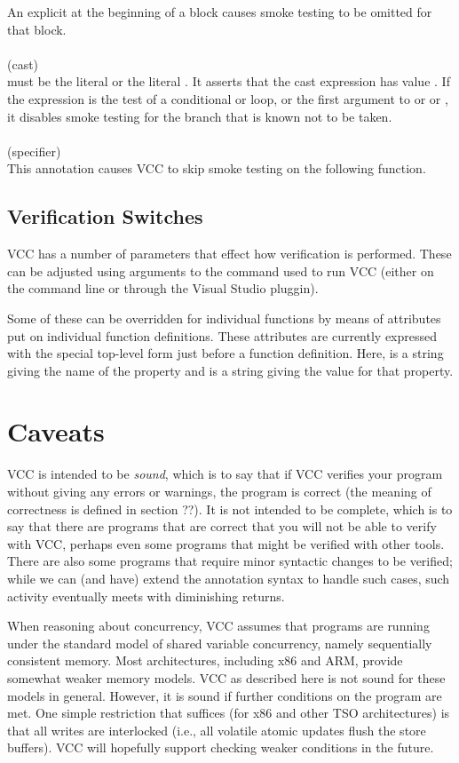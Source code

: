 \documentclass[preprint,nocopyrightspace]{sigplanconf}
\begin{document}
{{{An explicit  at the beginning of a block causes
smoke testing to be omitted for that block. 
\\\\
 (cast)\\
 must be the literal \vcc{\true} or the
literal \vcc{\false}. It asserts that the cast expression has
value . If the expression is the test of a conditional or loop, or
the first argument to \vcc{||} or \vcc{&&} or , it disables
smoke testing for the branch that is known not to be taken.
\\\\
 (specifier)\\
This annotation causes VCC to skip smoke testing on the following function.

\subsection{Verification Switches}
VCC has a number of parameters that effect how verification is
performed. These can be adjusted using arguments to the command used
to run VCC (either on the command line or through the Visual Studio
pluggin). 

Some of these can be overridden for individual functions by
means of attributes put on individual function definitions. These
attributes are currently expressed with the special top-level form 
 just before a function
definition. Here,  is a string giving the name
of the property and  is a string giving the value for
that property. 


\section{Caveats}
VCC is intended to be \emph{sound}, which is to say that if VCC
verifies your program without giving any errors or warnings, the
program is correct (the meaning of correctness is defined in section
??). It is not intended to be complete, which is to say that there are
programs that are correct that you will not be able to verify with
VCC, perhaps even some programs that might be verified with other
tools. There are also some programs that require minor syntactic
changes to be verified; while we can (and have) extend the annotation
syntax to handle such cases, such activity eventually meets with
diminishing returns.

When reasoning about concurrency, VCC assumes that programs are
running under the standard model of shared variable concurrency,
namely sequentially consistent memory. Most architectures, including
x86 and ARM, provide somewhat weaker memory models. VCC as described
here is not sound for these models in general. However, it is sound if
further conditions on the program are met. One simple restriction that
suffices (for x86 and other TSO architectures) is that all writes are
interlocked (i.e., all volatile atomic updates flush the store
buffers). VCC will hopefully support checking weaker conditions in the
future.

}}}
\end{document}
